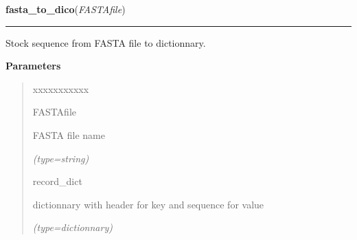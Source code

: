 \hspace{.8\funcindent}\begin{boxedminipage}{\funcwidth}

    \raggedright \textbf{fasta\_to\_dico}(\textit{FASTAfile})

    \vspace{-1.5ex}

    \rule{\textwidth}{0.5\fboxrule}
\setlength{\parskip}{2ex}
    Stock sequence from FASTA file to dictionnary.

\setlength{\parskip}{1ex}
      \textbf{Parameters}
      \vspace{-1ex}

      \begin{quote}
        \begin{Ventry}{xxxxxxxxxxx}

          \item[FASTAfile]

          FASTA file name

            {\it (type=string)}

          \item[record\_dict]

          dictionnary with header for key and sequence for value

            {\it (type=dictionnary)}

        \end{Ventry}

      \end{quote}

    \end{boxedminipage}

    \label{script-VCFtoPseudoGenome:check_ref}

    \vspace{0.5ex}

